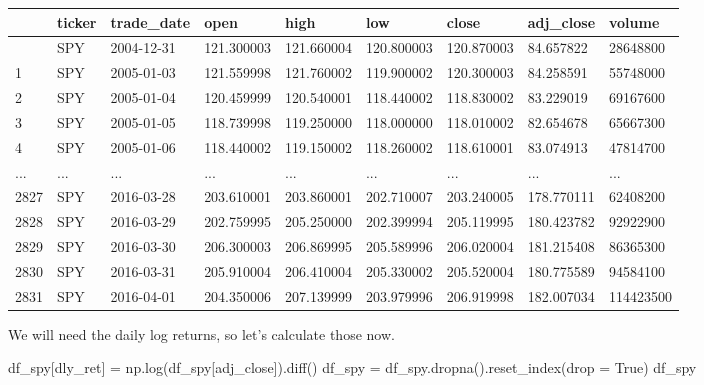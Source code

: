 \documentclass[
  letterpaper,
  DIV=11,
  numbers=noendperiod]{scrreprt}
\newenvironment{Shaded}{\begin{snugshade}}{\end{snugshade}}
\newcommand{\NormalTok}[1]{\textcolor[rgb]{0.00,0.23,0.31}{#1}}
\newcommand{\OperatorTok}[1]{\textcolor[rgb]{0.37,0.37,0.37}{#1}}
\newcommand{\StringTok}[1]{\textcolor[rgb]{0.13,0.47,0.30}{#1}}
\newcommand{\VariableTok}[1]{\textcolor[rgb]{0.07,0.07,0.07}{#1}}
\begin{document}
\begin{longtable}[]{@{}lllllllll@{}}
\toprule\noalign{}
& ticker & trade\_date & open & high & low & close & adj\_close &
volume \\
\midrule\noalign{}
\endhead
\bottomrule\noalign{}
\endlastfoot
0 & SPY & 2004-12-31 & 121.300003 & 121.660004 & 120.800003 & 120.870003
& 84.657822 & 28648800 \\
1 & SPY & 2005-01-03 & 121.559998 & 121.760002 & 119.900002 & 120.300003
& 84.258591 & 55748000 \\
2 & SPY & 2005-01-04 & 120.459999 & 120.540001 & 118.440002 & 118.830002
& 83.229019 & 69167600 \\
3 & SPY & 2005-01-05 & 118.739998 & 119.250000 & 118.000000 & 118.010002
& 82.654678 & 65667300 \\
4 & SPY & 2005-01-06 & 118.440002 & 119.150002 & 118.260002 & 118.610001
& 83.074913 & 47814700 \\
... & ... & ... & ... & ... & ... & ... & ... & ... \\
2827 & SPY & 2016-03-28 & 203.610001 & 203.860001 & 202.710007 &
203.240005 & 178.770111 & 62408200 \\
2828 & SPY & 2016-03-29 & 202.759995 & 205.250000 & 202.399994 &
205.119995 & 180.423782 & 92922900 \\
2829 & SPY & 2016-03-30 & 206.300003 & 206.869995 & 205.589996 &
206.020004 & 181.215408 & 86365300 \\
2830 & SPY & 2016-03-31 & 205.910004 & 206.410004 & 205.330002 &
205.520004 & 180.775589 & 94584100 \\
2831 & SPY & 2016-04-01 & 204.350006 & 207.139999 & 203.979996 &
206.919998 & 182.007034 & 114423500 \\
\end{longtable}

We will need the daily log returns, so let's calculate those now.

\begin{Shaded}
\begin{Highlighting}[]
\NormalTok{df\_spy[}\StringTok{\textquotesingle{}dly\_ret\textquotesingle{}}\NormalTok{] }\OperatorTok{=}\NormalTok{ np.log(df\_spy[}\StringTok{\textquotesingle{}adj\_close\textquotesingle{}}\NormalTok{]).diff()}
\NormalTok{df\_spy }\OperatorTok{=}\NormalTok{ df\_spy.dropna().reset\_index(drop }\OperatorTok{=} \VariableTok{True}\NormalTok{)}
\NormalTok{df\_spy}
\end{Highlighting}
\end{Shaded}
\end{document}
